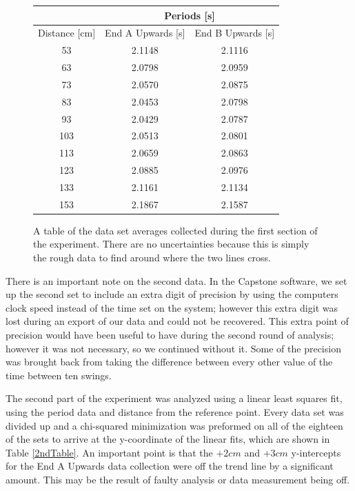 \documentclass[aps,prl,10pt,twocolumn,floatfix]{revtex4-2}
\begin{document}
\begin{figure}
\begin{tabular}{|c|c|c|}
\hline
& \multicolumn{2}{|c|}{Periods [s]}\\
\hline
Distance [cm] & End A Upwards [s] & End B Upwards [s]\\
\hline
53&	2.1148&	2.1116\\
63&	2.0798&	2.0959\\
73&	2.0570&	2.0875\\
83&	2.0453&	2.0798\\
93&	2.0429&	2.0787\\
103&	2.0513&	2.0801\\
113&	2.0659&	2.0863\\
123&	2.0885&	2.0976\\
133&	2.1161&	2.1134\\
153&	2.1867&	2.1587\\
\hline
\end{tabular}
\caption{A table of the data set averages collected during the first section of the experiment. There are no uncertainties because this is simply the rough data to find around where the two lines cross.}
\label{1stTable}
\end{figure}

There is an important note on the second data. 
In the Capstone software, we set up the second set to include an extra digit of precision by using the computers clock speed instead of the time set on the system;
however this extra digit was lost during an export of our data and could not be recovered.
This extra point of precision would have been useful to have during the second round of analysis;
however it was not necessary, so we continued without it.
Some of the precision was brought back from taking the difference between every other value of the time between ten swings.

The second part of the experiment was analyzed using a linear least squares fit, using the period data and distance from the reference point. 
Every data set was divided up and a chi-squared minimization was preformed on all of the eighteen of the sets to arrive at the y-coordinate of the linear fits, which are shown in Table \ref{2ndTable}.
An important point is that the $+2cm$ and $+3cm$ y-intercepts for the End A Upwards data collection were off the trend line by a significant amount.
This may be the result of faulty analysis or data measurement being off. 
\end{document}
